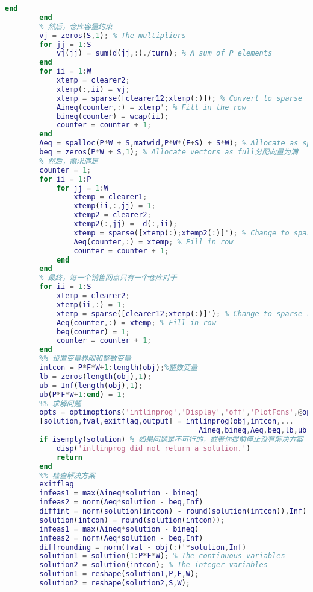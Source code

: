 \begin{lstlisting}[language = Matlab]
            end
        end
        % 然后，仓库容量约束
        vj = zeros(S,1); % The multipliers
        for jj = 1:S
            vj(jj) = sum(d(jj,:)./turn); % A sum of P elements
        end
        for ii = 1:W
            xtemp = clearer2;
            xtemp(:,ii) = vj;
            xtemp = sparse([clearer12;xtemp(:)]); % Convert to sparse
            Aineq(counter,:) = xtemp'; % Fill in the row
            bineq(counter) = wcap(ii);
            counter = counter + 1;
        end
        Aeq = spalloc(P*W + S,matwid,P*W*(F+S) + S*W); % Allocate as sparse
        beq = zeros(P*W + S,1); % Allocate vectors as full分配向量为满
        % 然后，需求满足
        counter = 1;
        for ii = 1:P
            for jj = 1:W
                xtemp = clearer1;
                xtemp(ii,:,jj) = 1;
                xtemp2 = clearer2;
                xtemp2(:,jj) = -d(:,ii);
                xtemp = sparse([xtemp(:);xtemp2(:)]'); % Change to sparse row
                Aeq(counter,:) = xtemp; % Fill in row
                counter = counter + 1;
            end
        end
        % 最终，每一个销售网点只有一个仓库对于
        for ii = 1:S
            xtemp = clearer2;
            xtemp(ii,:) = 1;
            xtemp = sparse([clearer12;xtemp(:)]'); % Change to sparse row改变稀疏的行
            Aeq(counter,:) = xtemp; % Fill in row
            beq(counter) = 1;
            counter = counter + 1;
        end
        %% 设置变量界限和整数变量
        intcon = P*F*W+1:length(obj);%整数变量
        lb = zeros(length(obj),1);
        ub = Inf(length(obj),1);
        ub(P*F*W+1:end) = 1;
        %% 求解问题
        opts = optimoptions('intlinprog','Display','off','PlotFcns',@optimplotmilp);
        [solution,fval,exitflag,output] = intlinprog(obj,intcon,...
                                             Aineq,bineq,Aeq,beq,lb,ub,opts);
        if isempty(solution) % 如果问题是不可行的，或者你提前停止没有解决方案
            disp('intlinprog did not return a solution.')
            return
        end
        %% 检查解决方案
        exitflag
        infeas1 = max(Aineq*solution - bineq)
        infeas2 = norm(Aeq*solution - beq,Inf)
        diffint = norm(solution(intcon) - round(solution(intcon)),Inf)
        solution(intcon) = round(solution(intcon));
        infeas1 = max(Aineq*solution - bineq)
        infeas2 = norm(Aeq*solution - beq,Inf)
        diffrounding = norm(fval - obj(:)'*solution,Inf)
        solution1 = solution(1:P*F*W); % The continuous variables
        solution2 = solution(intcon); % The integer variables
        solution1 = reshape(solution1,P,F,W);
        solution2 = reshape(solution2,S,W);

\end{lstlisting}
